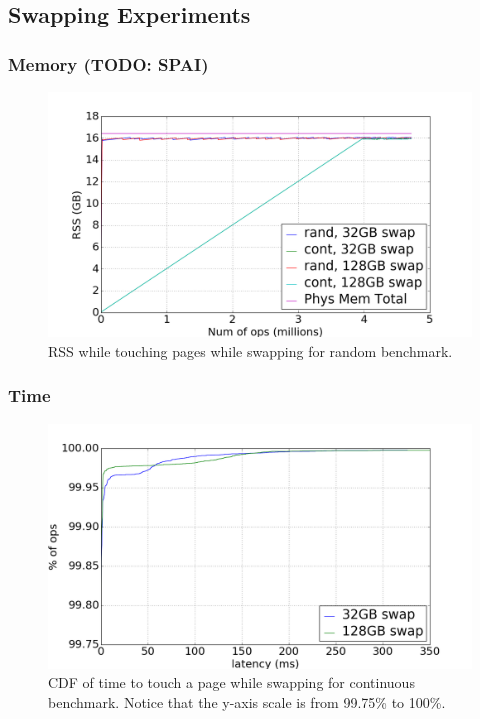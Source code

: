 \documentclass[twocolumn,11pt]{article}
\begin{document}
\subsection{Swapping Experiments}

\subsubsection{Memory (TODO: SPAI)}

\begin{figure}
    \includegraphics[width=\columnwidth]{figures/swap_rss}
    \caption{RSS while touching pages while swapping for random benchmark.}
\end{figure}

\subsubsection{Time}

\begin{figure}
    \includegraphics[width=\columnwidth]{figures/swap_touch_time_cont_cdf}
    \caption{CDF of time to touch a page while swapping for continuous
    benchmark. Notice that the y-axis scale is from 99.75\% to 100\%.
    \label{fig:swap_time_cont_cdf}}
\end{figure}
\end{document}

